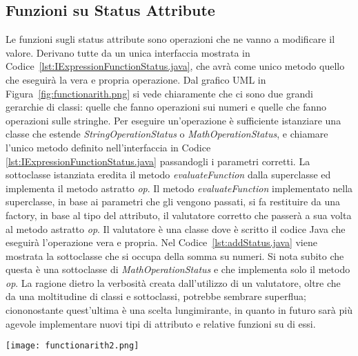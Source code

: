 \subsection{Funzioni su Status Attribute}
\label{sub:funzioni_status_attribute}
Le funzioni sugli status attribute sono operazioni che ne vanno a modificare il valore. Derivano tutte da un unica interfaccia mostrata in Codice~\ref{lst:IExpressionFunctionStatus.java}, che avrà come unico metodo quello che eseguirà la vera e propria operazione.
Dal grafico UML in Figura~\ref{fig:functionarith.png} si vede chiaramente che ci sono due grandi gerarchie di classi: quelle che fanno operazioni sui numeri e quelle che fanno operazioni sulle stringhe.
Per eseguire un'operazione è sufficiente istanziare una classe che estende \textit{StringOperationStatus} o \textit{MathOperationStatus}, e chiamare l'unico metodo definito nell'interfaccia in Codice \ref{lst:IExpressionFunctionStatus.java} passandogli i parametri corretti. La sottoclasse istanziata eredita il metodo \textit{evaluateFunction} dalla superclasse ed implementa il metodo astratto \textit{op}. Il metodo \textit{evaluateFunction} implementato nella superclasse, in base ai parametri che gli vengono passati, si fa restituire da una factory, in base al tipo del attributo, il valutatore corretto che passerà a sua volta al metodo astratto \textit{op}. Il valutatore è una classe dove è scritto il codice Java che eseguirà l'operazione vera e propria.
Nel Codice~\ref{lst:addStatus.java} viene mostrata la sottoclasse che si occupa della somma su numeri. Si nota subito che questa è una sottoclasse di \textit{MathOperationStatus} e che implementa solo il metodo \textit{op}.
La ragione dietro la verbosità creata dall'utilizzo di un valutatore, oltre che da una moltitudine di classi e sottoclassi, potrebbe sembrare superflua; ciononostante quest'ultima è una scelta lungimirante, in quanto in futuro sarà più agevole implementare nuovi tipi di attributo e relative funzioni su di essi.

\begin{sidewaysfigure}
	\texttt{[image: functionarith2.png]}
    \caption{Grafico UML per la gerarchia di funzioni aritmetiche}
    \label{fig:functionarith.png}
\end{sidewaysfigure}

